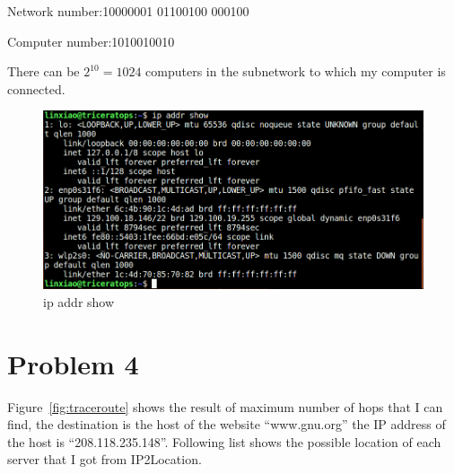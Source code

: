 \documentclass[paper=a4, fontsize=11pt]{scrartcl} %
\numberwithin{equation}{section} %
\numberwithin{figure}{section} %
\numberwithin{table}{section} %
\begin{document}
Network number:10000001 01100100 000100

Computer number:1010010010

There can be $2^{10} = 1024$ computers in the subnetwork to which my computer is connected.
\begin{figure}[h]
	\centering
	\includegraphics[width=\textwidth]{A1Q3.png}
	\caption{ip addr show}
	\label{fig:ipshow}
\end{figure}

\section*{Problem 4}
Figure~\ref{fig:traceroute} shows the result of maximum number of hops that I can find, the destination is the host of the website ``www.gnu.org'' the IP address of the host is ``208.118.235.148''. Following list shows the possible location of each server that I got from IP2Location.
\end{document}

